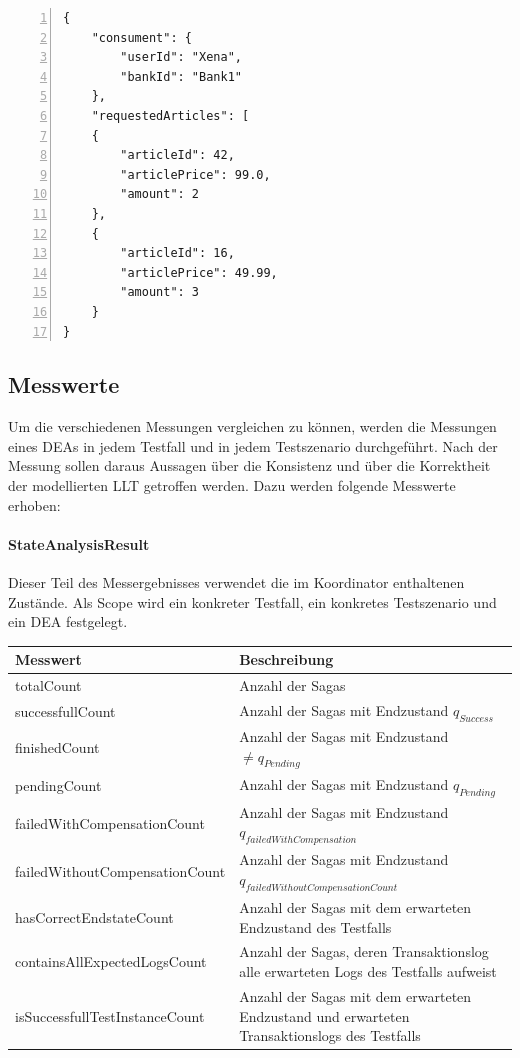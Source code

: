 \begin{lstlisting}[breaklines=true, tabsize=2, showstringspaces=false, frame=single, numbers=left, basicstyle=\small, label = {lst:PlaceOrderJson}, caption={Json für dynamisch generierte Bestellung}, captionpos=b] 
{
	"consument": {
		"userId": "Xena",
		"bankId": "Bank1"
	},
	"requestedArticles": [
	{
		"articleId": 42,
		"articlePrice": 99.0,
		"amount": 2
	},
	{
		"articleId": 16,
		"articlePrice": 49.99,
		"amount": 3
	}
}
\end{lstlisting}

\subsection{Messwerte}
Um die verschiedenen Messungen vergleichen zu können, werden die Messungen eines DEAs in jedem Testfall und in jedem Testszenario durchgeführt. Nach der Messung sollen daraus Aussagen über die Konsistenz und über die Korrektheit der modellierten LLT getroffen werden. Dazu werden folgende Messwerte erhoben:

\paragraph*{StateAnalysisResult}
Dieser Teil des Messergebnisses verwendet die im Koordinator enthaltenen Zustände. Als Scope wird ein konkreter Testfall, ein konkretes Testszenario und ein DEA festgelegt.

\begin{center}
\begin{longtable}[h]{|p{5cm}|p{12cm}|}
	\hline
	Messwert & Beschreibung \\ \hline
	totalCount & Anzahl der Sagas \\ \hline
	successfullCount & Anzahl der Sagas mit Endzustand $q_{Success}$ \\ \hline
	finishedCount & Anzahl der Sagas mit Endzustand $\not = q_{Pending}$ \\ \hline
	pendingCount & Anzahl der Sagas mit Endzustand $q_{Pending}$ \\ \hline
	failedWithCompensation\-Count & Anzahl der Sagas mit Endzustand $q_{failedWithCompensation}$ \\ \hline
	failedWithoutCompensation\-Count & Anzahl der Sagas mit Endzustand $q_{failedWithoutCompensationCount}$ \\ \hline
	hasCorrectEndstateCount & Anzahl der Sagas mit dem erwarteten Endzustand des Testfalls \\ \hline
	containsAllExpectedLogs\-Count & Anzahl der Sagas, deren Transaktionslog alle erwarteten Logs des Testfalls aufweist \\ \hline
	isSuccessfullTestInstance\-Count & Anzahl der Sagas mit dem erwarteten Endzustand und erwarteten Transaktionslogs des Testfalls \\ \hline
\end{longtable}
\end{center}
\FloatBarrier

